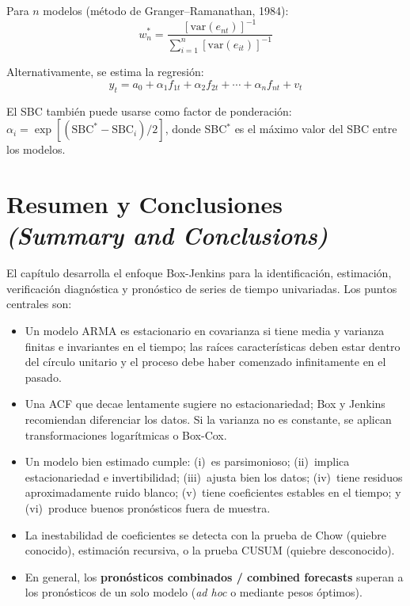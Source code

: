 \documentclass[12pt]{article}
\begin{document}
Para $n$ modelos (m\'etodo de Granger--Ramanathan, 1984):
\begin{equation}
w_n^* = \frac{[\text{var}(e_{nt})]^{-1}}
             {\sum_{i=1}^n [\text{var}(e_{it})]^{-1}}
\end{equation}

Alternativamente, se estima la regresi\'on:
\begin{equation}
y_t = a_0 + \alpha_1 f_{1t} + \alpha_2 f_{2t} + \cdots + \alpha_n f_{nt} + v_t
\end{equation}

El SBC tambi\'en puede usarse como factor de ponderaci\'on:
$\alpha_i = \exp[(\text{SBC}^* - \text{SBC}_i)/2]$,
donde SBC$^*$ es el m\'aximo valor del SBC entre los modelos.

\section{Resumen y Conclusiones \textit{(Summary and Conclusions)}}

El cap\'itulo desarrolla el enfoque Box-Jenkins para la identificaci\'on, estimaci\'on, verificaci\'on diagn\'ostica y pron\'ostico de series de tiempo univariadas. Los puntos centrales son:

\begin{itemize}
  \item Un modelo ARMA es estacionario en covarianza si tiene media y varianza finitas e invariantes en el tiempo; las ra\'ices caracter\'isticas deben estar dentro del c\'irculo unitario y el proceso debe haber comenzado infinitamente en el pasado.
  \item Una ACF que decae lentamente sugiere no estacionariedad; Box y Jenkins recomiendan diferenciar los datos. Si la varianza no es constante, se aplican transformaciones logar\'itmicas o Box-Cox.
  \item Un modelo bien estimado cumple: (i)~es parsimonioso; (ii)~implica estacionariedad e invertibilidad; (iii)~ajusta bien los datos; (iv)~tiene residuos aproximadamente ruido blanco; (v)~tiene coeficientes estables en el tiempo; y (vi)~produce buenos pron\'osticos fuera de muestra.
  \item La inestabilidad de coeficientes se detecta con la prueba de Chow (quiebre conocido), estimaci\'on recursiva, o la prueba CUSUM (quiebre desconocido).
  \item En general, los \textbf{pron\'osticos combinados / combined forecasts} superan a los pron\'osticos de un solo modelo (\textit{ad hoc} o mediante pesos \'optimos).
\end{itemize}
\end{document}
